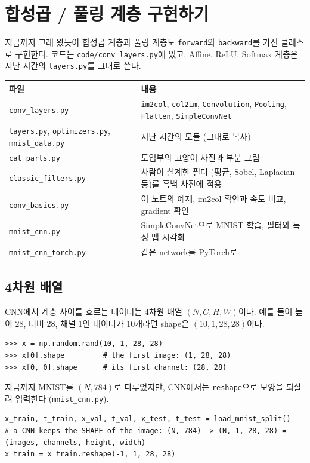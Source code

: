 \documentclass[11pt,a4paper]{article}
\begin{document}
\section{합성곱 / 풀링 계층 구현하기}\label{sec:impl}

지금까지 그래 왔듯이 합성곱 계층과 풀링 계층도 \texttt{forward}와 \texttt{backward}를 가진 클래스로 구현한다.
코드는 \texttt{code/conv\_layers.py}에 있고, Affine, ReLU, Softmax 계층은 지난 시간의 \texttt{layers.py}를 그대로 쓴다.

\begin{center}
\begin{tabular}{@{}p{}p{}@{}}
\toprule
파일 & 내용 \\
\midrule
\texttt{conv\_layers.py} & \texttt{im2col}, \texttt{col2im}, \texttt{Convolution}, \texttt{Pooling}, \texttt{Flatten}, \texttt{SimpleConvNet} \\
\texttt{layers.py}, \texttt{optimizers.py}, \texttt{mnist\_data.py} & 지난 시간의 모듈 (그대로 복사) \\[2pt]
\texttt{cat\_parts.py} & 도입부의 고양이 사진과 부분 그림 \\
\texttt{classic\_filters.py} & 사람이 설계한 필터 (평균, Sobel, Laplacian 등)를 흑백 사진에 적용 \\
\texttt{conv\_basics.py} & 이 노트의 예제, im2col 확인과 속도 비교, gradient 확인 \\
\texttt{mnist\_cnn.py} & SimpleConvNet으로 MNIST 학습, 필터와 특징 맵 시각화 \\
\texttt{mnist\_cnn\_torch.py} & 같은 network를 PyTorch로 \\
\bottomrule
\end{tabular}
\end{center}

\subsection{4차원 배열}\label{sec:4d}

CNN에서 계층 사이를 흐르는 데이터는 4차원 배열 $(N,C,H,W)$이다.
예를 들어 높이 $28$, 너비 $28$, 채널 $1$인 데이터가 $10$개라면 shape은 $(10,1,28,28)$이다.
\begin{lstlisting}[language={},numbers=none]
>>> x = np.random.rand(10, 1, 28, 28)
>>> x[0].shape         # the first image: (1, 28, 28)
>>> x[0, 0].shape      # its first channel: (28, 28)
\end{lstlisting}
지금까지 MNIST를 $(N,784)$로 다루었지만, CNN에서는 \texttt{reshape}으로 모양을 되살려 입력한다 (\texttt{mnist\_cnn.py}).
\begin{lstlisting}
x_train, t_train, x_val, t_val, x_test, t_test = load_mnist_split()
# a CNN keeps the SHAPE of the image: (N, 784) -> (N, 1, 28, 28) = (images, channels, height, width)
x_train = x_train.reshape(-1, 1, 28, 28)
\end{lstlisting}
\end{document}
